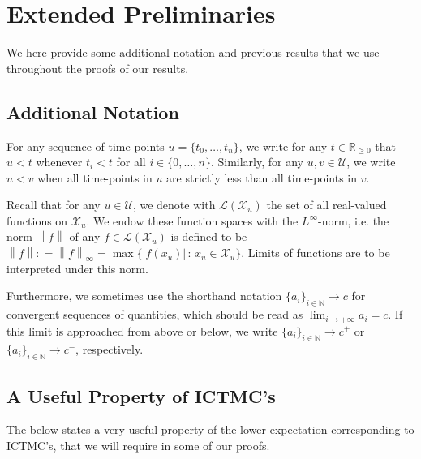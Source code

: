 \documentclass[twoside,11pt]{article}
\newcommand{\nats}{\mathbb{N}}
\newcommand{\reals}{\mathbb{R}}
\newcommand{\realsnonneg}{\reals_{\geq 0}}
\newcommand{\states}{\mathcal{X}}
\newcommand{\gambles}{\mathcal{L}}
\newcommand{\norm}[1]{\left\lVert #1 \right\rVert}
\newcommand{\abs}[1]{\left\vert #1 \right\vert}
\newcommand{\coloneqq}{:\!=}
\begin{document}
\appendix


%


\newpage


\section{Extended Preliminaries}

We here provide some additional notation and previous results that we use throughout the proofs of our results.

\subsection{Additional Notation}

For any sequence of time points $u=\{t_0,\ldots,t_n\}$, we write for any $t\in\realsnonneg$ that $u<t$ whenever $t_i<t$ for all $i\in\{0,\ldots,n\}$. Similarly, for any $u,v\in\mathcal{U}$, we write $u< v$ when all time-points in $u$ are strictly less than all time-points in $v$.

Recall that for any $u\in\mathcal{U}$, we denote with $\gambles(\states_u)$ the set of all real-valued functions on $\states_u$. We endow these function spaces with the $L^\infty$-norm, i.e. the norm $\norm{f}$ of any $f\in\gambles(\states_u)$ is defined to be $\norm{f}\coloneqq\norm{f}_\infty=\max\{\abs{f(x_u)}\,:\,x_u\in\states_u\}$. Limits of functions are to be interpreted under this norm.

Furthermore, we sometimes use the shorthand notation $\{a_i\}_{i\in\nats}\to c$ for convergent sequences of quantities, which should be read as $\lim_{i\to+\infty}a_i=c$. If this limit is approached from above or below, we write $\{a_i\}_{i\in\nats}\to c^+$ or $\{a_i\}_{i\in\nats}\to c^-$, respectively.

\subsection{A Useful Property of ICTMC's}

The below states a very useful property of the lower expectation corresponding to ICTMC's, that we will require in some of our proofs.
\end{document}
